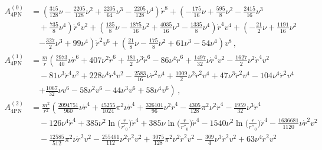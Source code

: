 \documentclass[prd,preprint,superscriptaddress,tightenlines,nofootinbib,
  eqsecnum,showpacs]{revtex4}
\begin{document}
\begin{subequations}
%
\begin{align}
A^{(0)}_\text{4PN} &= \left(\frac{315}{128} \nu -  \frac{2205}{128} \nu^2 +
                     \frac{2205}{64} \nu^3 -  \frac{2205}{128} \nu^4\right)
                     \dot{r}^8 + \left(- \frac{175}{16} \nu + \frac{595}{8}
                     \nu^2 -  \frac{2415}{16} \nu^3 \right.\nonumber\\
&\left.\quad + \frac{735}{8} \nu^4\right) \dot{r}^6 v^{2} +
  \left(\frac{135}{8} \nu -  \frac{1875}{16} \nu^2 + \frac{4035}{16} \nu^3 -
  \frac{1335}{8} \nu^4\right) \dot{r}^4 v^{4} + \left(- \frac{21}{2} \nu +
  \frac{1191}{16} \nu^2\right.\nonumber\\
&\quad\left. -  \frac{327}{2} \nu^3 + 99 \nu^4\right) \dot{r}^2 v^{6} +
  \left(\frac{21}{8} \nu -  \frac{175}{8} \nu^2 + 61 \nu^3  - 54 \nu^4\right)
  v^{8}
 \,,\\
A^{(1)}_\text{4PN} &= \frac{m}{r} \left(\frac{2973}{40} \nu \dot{r}^6
+ 407 \nu^2 \dot{r}^6+ \frac{181}{2} \nu^3 \dot{r}^6 - 86 \nu^4 \dot{r}^6 
+ \frac{1497}{32} \nu \dot{r}^4 v^{2}
 -  \frac{1627}{2} \nu^2 \dot{r}^4 v^{2} \right.\nonumber\\
& \quad- 81 \nu^3 \dot{r}^4 v^{2} + 228 \nu^4 \dot{r}^4 v^{2} 
-  \frac{2583}{16} \nu \dot{r}^2 v^{4} + \frac{1009}{2} \nu^2 \dot{r}^2 v^{4} 
+ 47 \nu^3 \dot{r}^2 v^{4} - 104 \nu^4 \dot{r}^2 v^{4}\nonumber\\
&\quad\left. + \frac{1067}{32} \nu v^{6} - 58 \nu^2 v^{6} - 44 \nu^3 v^{6} 
+ 58 \nu^4 v^{6}\right)
 \,,\\
A^{(2)}_\text{4PN} &= \frac{m^2}{r^2} \left(\frac{2094751}{960} \nu \dot{r}^4
 + \frac{45255}{1024} \pi^2 \nu \dot{r}^4
 + \frac{326101}{96} \nu^2 \dot{r}^4
 -  \frac{4305}{128} \pi^2 \nu^2 \dot{r}^4
 -  \frac{1959}{32} \nu^3 \dot{r}^4\right.\nonumber\\
& \quad - 126 \nu^4 \dot{r}^4
 + 385 \nu^2 \ln\Big(\frac{r}{r'_{0}}\Big) \dot{r}^4
 + 385 \nu \ln\Big(\frac{r}{r''_{0}}\Big) \dot{r}^4
 - 1540 \nu^2 \ln\Big(\frac{r}{r''_{0}}\Big) \dot{r}^4
 -  \frac{1636681}{1120} \nu \dot{r}^2 v^{2}\nonumber\\
& \quad -  \frac{12585}{512} \pi^2 \nu \dot{r}^2 v^{2}
 -  \frac{255461}{112} \nu^2 \dot{r}^2 v^{2}
 + \frac{3075}{128} \pi^2 \nu^2 \dot{r}^2 v^{2}
 -  \frac{309}{4} \nu^3 \dot{r}^2 v^{2}
 + 63 \nu^4 \dot{r}^2 v^{2}\nonumber\\

\end{align}
\end{subequations}
\end{document}
